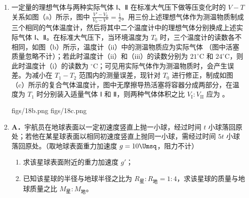 \documentclass[\gkver]{gaokaozhenti}
\begin{document}
\begin{enumerate}
\item
一定量的理想气体与两种实际气体 Ⅰ、Ⅱ 在标准大气压下做等压变化时的 $V-T$ 关系如图（a）所示，图中 $\frac{V'-V_{0}}{V_{0}-V''}=\frac{1}{2}$。用三份上述理想气体作为测温物质制成三个相同的气体温度计，然后将其中二个温度计中的理想气体分别换成上述实际气体 Ⅰ、Ⅱ。在标准大气压下，当环境温度为 $T_{0}$ 时，三个温度计的读数各不相同，如图（b）所示，温度计（ii）中的测温物质应为实际气体 （图中活塞质量忽略不计）；若此时温度计（ii）和（iii）的读数分别为 $21^{\circ}\mathrm{C}$ 和 $24^{\circ}\mathrm{C}$，则此时温度计（i）的读数为  $^{\circ}\mathrm{C}$；可见用实际气体作为测温物质时，会产生误差。为减小在 $T_{1}-T_{2}$ 范围内的测量误差，现针对 $T_{0}$ 进行修正，制成如图（c）所示的复合气体温度计，图中无摩擦导热活塞将容器分成两部分，在温度为 $T_{1}$ 时分别装入适量气体 Ⅰ 和 Ⅱ，则两种气体体积之比 $V_{\mathrm{I}}:V_{\mathrm{II}}$ 应为 。

\threepicture[labelA=2007上海18a, labelB=2007上海18b, labelC=2007上海18c, align=right, wA=5.10cm, hB=5.26cm, hC=5.22cm]
{}
{figs/18b.png}
{figs/18c.png}



\item
\textbf{A．}宇航员在地球表面以一定初速度竖直上抛一小球，经过时间 $t$ 小球落回原处；若他在某星球表面以相同初速度竖直上抛同一小球，需经过时间 $5t$ 小球落回原处。（取地球表面重力加速度 $g=10\Umsq$，阻力不计）

\begin{enumerate}
	\item
	求该星球表面附近的重力加速度 $g'$；
	\item
	已知该星球的半径与地球半径之比为 $R_{\text{星}}:R_{\text{地}}=1:4$，求该星球的质量与地球质量之比 $M_{\text{星}}:M_{\text{地}}$。
\end{enumerate}


\end{enumerate}
\end{document}
